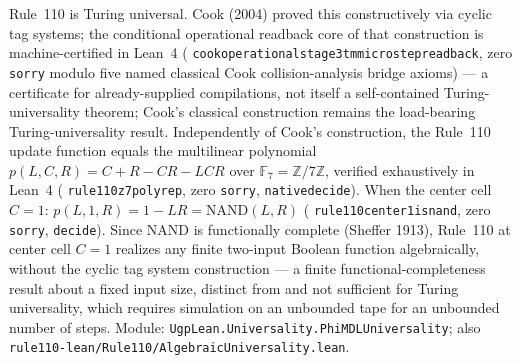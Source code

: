 \documentclass[11pt]{article}
\theoremstyle{remark}
\newcommand{\lean}[1]{%
  \penalty-100
  \begingroup\def\_{\textunderscore\allowbreak}\texttt{#1}\endgroup}
\begin{document}
\medskip

\begin{tcolorbox}[colback=blue!3,colframe=blue!40!black,
  title={\textbf{Finite NAND Functional Completeness (Cook-independent)}},
  fonttitle=\bfseries,left=6pt,right=6pt,top=4pt,bottom=4pt]
\small
Rule~110 is Turing universal. Cook (2004) proved this constructively via cyclic tag
systems; the conditional operational readback core of that construction is
machine-certified in Lean~4
(\lean{cook\_operational\_stage3\_tm\_microstep\_readback}, zero \texttt{sorry} modulo five named
classical Cook collision-analysis bridge axioms) --- a certificate for already-supplied
compilations, not itself a self-contained Turing-universality theorem; Cook's classical
construction remains the load-bearing Turing-universality result.
Independently of Cook's construction, the Rule~110 update function equals the
multilinear polynomial $p(L,C,R)=C+R-CR-LCR$ over $\mathbb{F}_7 = \mathbb{Z}/7\mathbb{Z}$,
verified exhaustively in Lean~4 (\lean{rule110\_z7\_poly\_rep}, zero \texttt{sorry},
\lean{native\_decide}).
When the center cell $C=1$: $p(L,1,R)=1-LR=\mathrm{NAND}(L,R)$
(\lean{rule110\_center1\_is\_nand}, zero \texttt{sorry}, \lean{decide}).
Since NAND is functionally complete (Sheffer 1913), Rule~110 at center cell $C=1$
realizes any finite two-input Boolean function algebraically, without the cyclic tag
system construction --- a finite functional-completeness result about a fixed input
size, distinct from and not sufficient for Turing universality, which requires
simulation on an unbounded tape for an unbounded number of steps.
Module: \lean{UgpLean.Universality.PhiMDLUniversality};
also \lean{rule110-lean/Rule110/AlgebraicUniversality.lean}.
\end{tcolorbox}

\medskip
\end{document}
